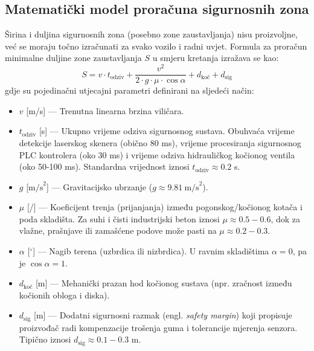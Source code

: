 \documentclass[12pt,a4paper]{article}
\begin{document}
\subsection{Matematički model proračuna sigurnosnih zona}
Širina i duljina sigurnosnih zona (posebno zone zaustavljanja) nisu proizvoljne, već se moraju točno izračunati za svako vozilo i radni uvjet. Formula za proračun minimalne duljine zone zaustavljanja $S$ u smjeru kretanja izražava se kao:
\begin{equation}
    S = v \cdot t_{\text{odziv}} + \frac{v^2}{2 \cdot g \cdot \mu \cdot \cos\alpha} + d_{\text{koč}} + d_{\text{sig}}
\end{equation}
gdje su pojedinačni utjecajni parametri definirani na sljedeći način:
\begin{itemize}
    \item $v$ [m/s] — Trenutna linearna brzina viličara.
    \item $t_{\text{odziv}}$ [s] — Ukupno vrijeme odziva sigurnosnog sustava. Obuhvaća vrijeme detekcije laserskog skenera (obično 80 ms), vrijeme procesiranja sigurnosnog PLC kontrolera (oko 30 ms) i vrijeme odziva hidrauličkog kočionog ventila (oko 50-100 ms). Standardna vrijednost iznosi $t_{\text{odziv}} \approx 0.2$ s.
    \item $g$ [$\text{m/s}^2$] — Gravitacijsko ubrzanje ($g \approx 9.81 \ \text{m/s}^2$).
    \item $\mu$ [/] — Koeficijent trenja (prijanjanja) između pogonskog/kočionog kotača i poda skladišta. Za suhi i čisti industrijski beton iznosi $\mu \approx 0.5 - 0.6$, dok za vlažne, prašnjave ili zamašćene podove može pasti na $\mu \approx 0.2 - 0.3$.
    \item $\alpha$ [$^\circ$] — Nagib terena (uzbrdica ili nizbrdica). U ravnim skladištima $\alpha = 0$, pa je $\cos\alpha = 1$.
    \item $d_{\text{koč}}$ [m] — Mehanički prazan hod kočionog sustava (npr. zračnost između kočionih obloga i diska).
    \item $d_{\text{sig}}$ [m] — Dodatni sigurnosni razmak (engl. \textit{safety margin}) koji propisuje proizvođač radi kompenzacije trošenja guma i tolerancije mjerenja senzora. Tipično iznosi $d_{\text{sig}} \approx 0.1 - 0.3$ m.
\end{itemize}
\end{document}
